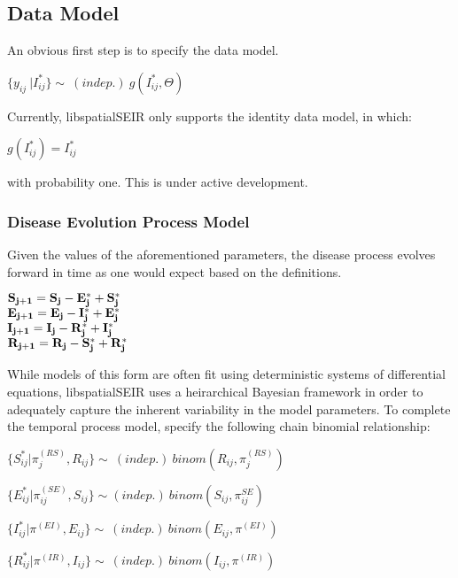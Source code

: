 \documentclass[12pt]{article}
\newcommand \mbreak {\\ \vspace{0.1in}}
\begin{document}
    \subsection{Data Model}
    An obvious first step is to specify the data model. 

    \vspace{0.15in}

    \begin{center}
        $ \{y_{ij}\ | I^*_{ij}\} \sim\ (indep.)\ g(I^*_{ij}, \Theta)  $
    \end{center}

    Currently, libspatialSEIR only supports the identity data model, in which: 
    \begin{center}
        $g(I^*_{ij}) = I^*_{ij}$  
    \end{center}
    with probability one. This is under active development. \\

    \vspace{0.15in}

    \subsubsection{Disease Evolution Process Model}
    Given the values of the aforementioned parameters, the disease process evolves forward in time 
    as one would expect based on the definitions.  
    \begin{center}
        $\bf{S_{j+1}} = \bf{S_j} - \bf{E_j^*} + \bf{S_j^*}$\mbreak
        $\bf{E_{j+1}} = \bf{E_j} - \bf{I_j^*} + \bf{E_j^*}$\mbreak
        $\bf{I_{j+1}} = \bf{I_j} - \bf{R_j^*} + \bf{I_j^*}$\mbreak
        $\bf{R_{j+1}} = \bf{R_j} - \bf{S_j^*} + \bf{R_j^*}$\mbreak
    \end{center}
    \vspace{0.15in}

    While models of this form are often fit using deterministic systems of differential equations, libspatialSEIR uses
    a heirarchical Bayesian framework in order to adequately capture the inherent variability in the model parameters.
    To complete the temporal process model, specify the following chain binomial relationship: 
    \vspace{0.15in}
    {

        $\{S_{ij}^* | \pi_j^{(RS)}, R_{ij}\} \sim\ (indep.)\  binom(R_{ij}, \pi_j^{(RS)})$\mbreak

        $\{E_{ij}^* | \pi^{(SE)}_{ij}, S_{ij} \} \sim (indep.)\ binom(S_{ij}, \pi^{SE}_{ij})$ \mbreak

        $\{I_{ij}^* | \pi^{(EI)}, E_{ij} \} \sim\ (indep.)\ binom(E_{ij}, \pi^{(EI)})$\mbreak

        $\{R_{ij}^* | \pi^{(IR)}, I_{ij}\} \sim\ (indep.)\ binom(I_{ij}, \pi^{(IR)})$\mbreak
    }
\end{document}

